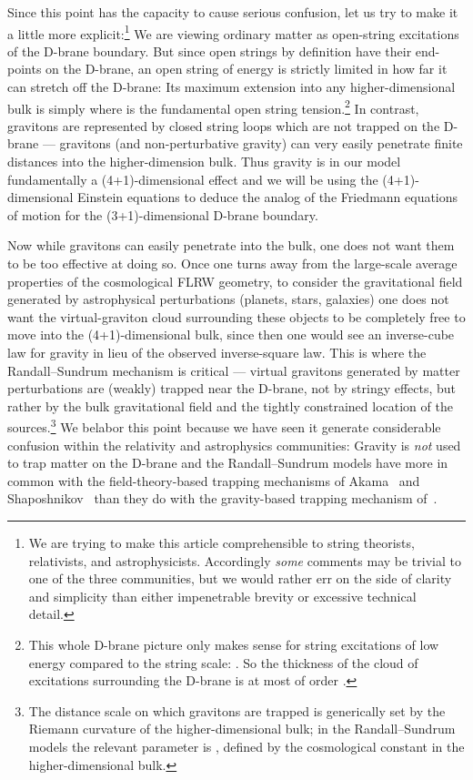 \documentclass[a4paper,12pt]{article}
\begin{document}
Since this point has the capacity to cause serious confusion, let us
try to make it a little more explicit:\footnote{
We are trying to make this article comprehensible to string theorists,
relativists, and astrophysicists. Accordingly {\em some} comments may
be trivial to one of the three communities, but we would rather err on
the side of clarity and simplicity than either impenetrable brevity or
excessive technical detail.}
We are viewing ordinary matter as open-string excitations of the
D-brane boundary. But since open strings by definition have their
end-points on the D-brane, an open string of energy \coordHE{} is strictly
limited in how far it can stretch off the D-brane: Its maximum
extension into any higher-dimensional bulk is simply
\coordHE{} where \coordHE{} is the fundamental open
string tension.\footnote{
This whole D-brane picture only makes sense for string excitations of
low energy compared to the string scale: \coordHE{}.  So the thickness of the cloud of excitations surrounding
the D-brane is at most of order \coordHE{}.}
In contrast, gravitons are represented by closed string loops which
are not trapped on the D-brane --- gravitons (and non-perturbative
gravity) can very easily penetrate finite distances into the
higher-dimension bulk. Thus gravity is in our model fundamentally a
(4+1)-dimensional effect and we will be using the (4+1)-dimensional
Einstein equations to deduce the analog of the Friedmann equations of
motion for the (3+1)-dimensional D-brane boundary.

Now while gravitons can easily penetrate into the bulk, one does not
want them to be too effective at doing so. Once one turns away from
the large-scale average properties of the cosmological FLRW geometry,
to consider the gravitational field generated by astrophysical
perturbations (planets, stars, galaxies) one does not want the
virtual-graviton cloud surrounding these objects to be completely free
to move into the (4+1)-dimensional bulk, since then one would see an
inverse-cube law for gravity in lieu of the observed inverse-square
law. This is where the Randall--Sundrum mechanism is critical ---
virtual gravitons generated by matter perturbations are (weakly)
trapped near the D-brane, not by stringy effects, but rather by the
bulk gravitational field and the tightly constrained location of the
sources.\footnote{
The distance scale on which gravitons are trapped is generically set
by the Riemann curvature of the higher-dimensional bulk; in the
Randall--Sundrum models the relevant parameter is \coordHE{}, defined by the cosmological constant in the
higher-dimensional bulk.}
We belabor this point because we have seen it generate considerable
confusion within the relativity and astrophysics communities: Gravity
is {\em not\/} used to trap matter on the D-brane and the
Randall--Sundrum models have more in common with the
field-theory-based trapping mechanisms of Akama~\cite{Akama} and
Shaposhnikov~\cite{Shaposhnikov} than they do with the gravity-based
trapping mechanism of~\cite{Exotic}.
\end{document}
